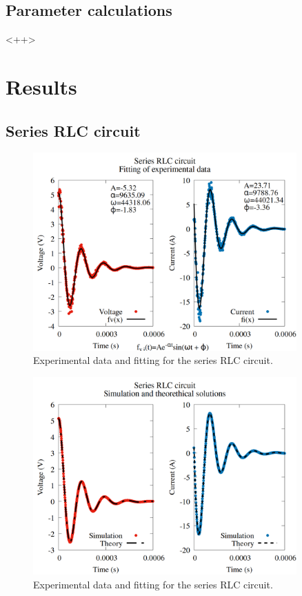 \documentclass[12pt,twoside]{extarticle}
\begin{document}
\subsection{Parameter calculations}

<++>

\section{Results}
\subsection{Series RLC circuit}
\begin{figure}[ht]
    \centering
    \includegraphics[width=0.9\textwidth]{figures/series_exp_vs_fitting.png}
    \caption{Experimental data and fitting for the series RLC circuit.}
    \label{fig:series_evf}
\end{figure}

\begin{figure}[ht]
    \centering
    \includegraphics[width=0.9\textwidth]{figures/series_sim_vs_ana.png}
    \caption{Experimental data and fitting for the series RLC circuit.}
    \label{fig:series_evf}
\end{figure}
\end{document}
